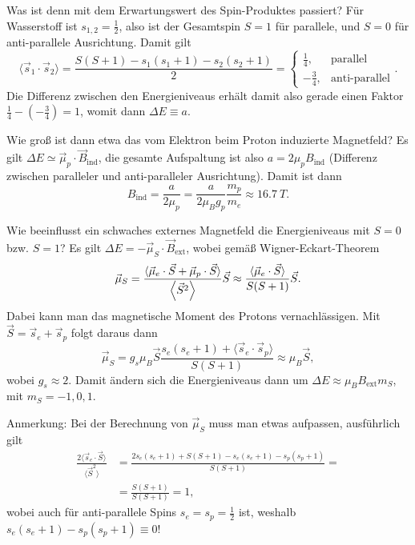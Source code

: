 \begin{fquestion}{Was ist denn mit dem Erwartungswert des Spin-Produktes passiert?}
    Für Wasserstoff ist $s_{1,2} = \frac{1}{2}$, also ist der Gesamtspin $S=1$ für parallele, und $S=0$ für anti-parallele Ausrichtung.
    Damit gilt 
    $$\langle \Vec{s}_1\cdot\Vec{s}_2\rangle = \frac{S(S+1) - s_1(s_1+1) - s_2(s_2+1)}{2} = \begin{cases} \frac{1}{4}, & \mathrm{parallel} \\ -\frac{3}{4}, & \text{anti-parallel} \end{cases}.$$
    Die Differenz zwischen den Energieniveaus erhält damit also gerade einen Faktor $\frac{1}{4} - \left(-\frac{3}{4}\right) = 1$, womit dann $\Delta E \equiv a$.
\end{fquestion}

\begin{fquestion}{Wie groß ist dann etwa das vom Elektron beim Proton induzierte Magnetfeld?}
    Es gilt $\Delta E \simeq \Vec{\mu}_p \cdot \Vec{B}_\mathrm{ind}$, die gesamte Aufspaltung ist also $a = 2\mu_p B_\mathrm{ind}$ (Differenz zwischen paralleler und anti-paralleler Ausrichtung).
    Damit ist dann 
    $$B_\mathrm{ind} = \frac{a}{2\mu_p} = \frac{a}{2\mu_B g_p} \frac{m_p}{m_e} \approx \SI{16.7}{T}.$$
\end{fquestion}

\begin{fquestion}{Wie beeinflusst ein schwaches externes Magnetfeld die Energieniveaus mit $S=0$ bzw. $S=1$?}
    Es gilt $\Delta E = -\Vec{\mu}_S\cdot\Vec{B}_\mathrm{ext}$, wobei gemäß Wigner-Eckart-Theorem
    $$\Vec{\mu}_S = \frac{\langle\Vec{\mu}_e\cdot\Vec{S} + \Vec{\mu}_p\cdot\Vec{S}\rangle}{\expval{\Vec{S}^2}} \Vec{S} \approx \frac{\langle\Vec{\mu}_e\cdot\Vec{S}\rangle}{S(S+1)} \Vec{S}.$$
    Dabei kann man das magnetische Moment des Protons vernachlässigen.
    Mit $\Vec{S} = \Vec{s}_e + \Vec{s}_p$ folgt daraus dann
    $$\Vec{\mu}_S = g_s\mu_B\Vec{S} \frac{s_e(s_e+1) + \langle\Vec{s}_e\cdot\Vec{s}_p\rangle }{S(S+1)} \approx \mu_B\Vec{S}, $$
    wobei $g_s\approx 2$.
    Damit ändern sich die Energieniveaus dann um $\Delta E \approx \mu_B B_\mathrm{ext} m_S$, mit $m_S=-1,0,1$.
    
    Anmerkung: Bei der Berechnung von $\Vec{\mu}_S$ muss man etwas aufpassen, ausführlich gilt
    $$\begin{aligned} \frac{2 \langle\Vec{s}_e\cdot\Vec{S}\rangle }{ \langle\Vec{S}^2\rangle } &= \frac{2s_e(s_e+1) +  S(S+1) - s_e(s_e+1) - s_p(s_p+1)}{S(S+1)} = \\
    &= \frac{S(S+1)}{S(S+1)}=1,\end{aligned}$$
    wobei auch für anti-parallele Spins $s_e=s_p=\frac{1}{2}$ ist, weshalb $s_e(s_e+1) - s_p(s_p+1) \equiv 0$!
\end{fquestion}

